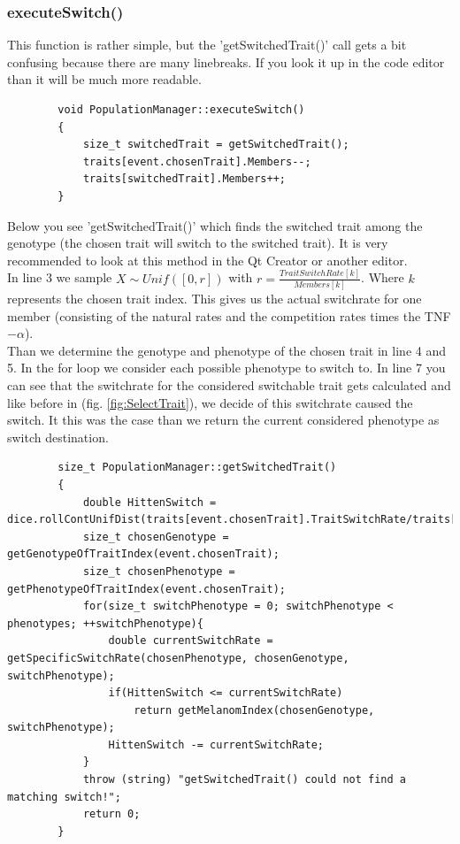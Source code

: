 \documentclass[a4paper,10pt]{scrartcl}
\begin{document}
		\subsubsection{executeSwitch()}
		This function is rather simple, but the 'getSwitchedTrait()' call gets a bit confusing because there are many linebreaks. If you look it up in the code editor than it will be much more readable.\\
		\begin{lstlisting}
		void PopulationManager::executeSwitch()
		{
		    size_t switchedTrait = getSwitchedTrait();
		    traits[event.chosenTrait].Members--;
		    traits[switchedTrait].Members++;
		}
		\end{lstlisting}
		Below you see 'getSwitchedTrait()' which finds the switched trait among the genotype (the chosen trait will switch to the switched trait). It is very recommended to look at this method in the Qt Creator or another editor.\\
		In line 3 we sample $ X \sim Unif([0,r]) $ with $ r = \frac{TraitSwitchRate[k]}{Members[k]} $. Where $ k $ represents the chosen trait index. This gives us the actual switchrate for one member (consisting of the natural rates and the competition rates times the TNF$ -\alpha $).\\
		Than we determine the genotype and phenotype of the chosen trait in line 4 and 5. In the for loop we consider each possible phenotype to switch to. In line 7 you can see that the switchrate for the considered switchable trait gets calculated and like before in  (fig. \ref{fig:SelectTrait}), we decide of this switchrate caused the switch. It this was the case than we return the current considered phenotype as switch destination.
		\begin{lstlisting}
		size_t PopulationManager::getSwitchedTrait()
		{
		    double HittenSwitch = dice.rollContUnifDist(traits[event.chosenTrait].TraitSwitchRate/traits[event.chosenTrait].Members);
		    size_t chosenGenotype = getGenotypeOfTraitIndex(event.chosenTrait);
		    size_t chosenPhenotype = getPhenotypeOfTraitIndex(event.chosenTrait);
		    for(size_t switchPhenotype = 0; switchPhenotype < phenotypes; ++switchPhenotype){
		        double currentSwitchRate = getSpecificSwitchRate(chosenPhenotype, chosenGenotype, switchPhenotype);
		        if(HittenSwitch <= currentSwitchRate)
		            return getMelanomIndex(chosenGenotype, switchPhenotype);
		        HittenSwitch -= currentSwitchRate;
		    }
		    throw (string) "getSwitchedTrait() could not find a matching switch!";
		    return 0;
		}
		\end{lstlisting}
		
\end{document}
